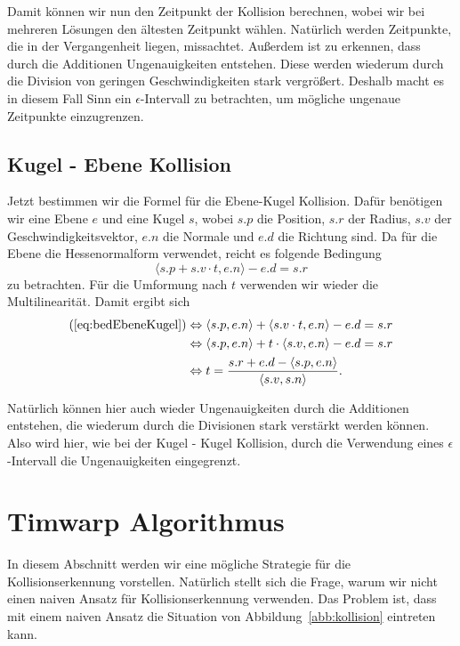 \documentclass[a4paper, 10pt, openright, parskip, chapterprefix]{scrreprt}
\begin{document}
\noindent Damit können wir nun den Zeitpunkt der Kollision berechnen, wobei wir bei mehreren Lösungen den ältesten Zeitpunkt wählen. Natürlich werden Zeitpunkte, die in der Vergangenheit liegen, missachtet. 
Außerdem ist zu erkennen, dass durch die Additionen Ungenauigkeiten entstehen. Diese werden wiederum
durch die Division von geringen Geschwindigkeiten stark vergrößert. Deshalb macht es in diesem
Fall Sinn ein $\epsilon$-Intervall zu betrachten, um mögliche ungenaue Zeitpunkte einzugrenzen.

\subsection{Kugel - Ebene Kollision}
Jetzt bestimmen wir die Formel für die Ebene-Kugel Kollision. Dafür benötigen wir eine Ebene $e$ und eine Kugel $s$, wobei $s.p$ die Position, $s.r$ der Radius, $s.v$ der Geschwindigkeitsvektor, $e.n$ die Normale und $e.d$ die Richtung sind.  Da für die Ebene die Hessenormalform verwendet, reicht es folgende Bedingung 
\begin{equation}
	\langle s.p + s.v  \cdot t, e.n \rangle - e.d = s.r
	\label{eq:bedEbeneKugel}
\end{equation}
zu betrachten. Für die Umformung nach $t$ verwenden wir wieder die Multilinearität. Damit ergibt sich
\begin{align*}
(\ref{eq:bedEbeneKugel}) &\Leftrightarrow \langle s.p, e.n \rangle + \langle s.v \cdot t, e.n \rangle - e.d = s.r \\
&\Leftrightarrow \langle s.p, e.n \rangle + t \cdot \langle s.v, e.n\rangle - e.d = s.r\\
&\Leftrightarrow t = \frac{s.r + e.d - \langle s.p, e.n \rangle}{ \langle s.v, s.n \rangle}\text{.}
\end{align*}

Natürlich können hier auch wieder Ungenauigkeiten durch die Additionen entstehen, die wiederum
durch die Divisionen stark verstärkt werden können. Also wird hier, wie bei der Kugel - Kugel
Kollision, durch die Verwendung eines $\epsilon$-Intervall die Ungenauigkeiten eingegrenzt.

\section{Timwarp Algorithmus}
\label{sec:TimewarpAlgoritmus}
In diesem Abschnitt werden wir eine mögliche Strategie für die Kollisionserkennung vorstellen. Natürlich  stellt sich
die Frage, warum wir nicht einen naiven Ansatz für Kollisionserkennung verwenden. Das Problem ist, dass mit einem naiven Ansatz die Situation von Abbildung~\ref{abb:kollision} eintreten kann.
\end{document}
